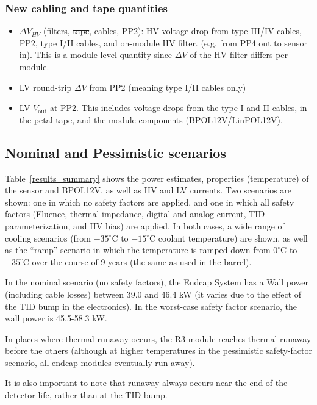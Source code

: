 \subsubsection{New cabling and tape quantities}

\begin{itemize}
\setlength\itemsep{0.0em}
\item $\Delta V_{HV}$ (filters, \sout{tape}, cables, PP2): HV voltage drop from type
III/IV cables, PP2, type I/II cables, and on-module HV filter. (e.g. from PP4 out to sensor in).
This is a module-level quantity since $\Delta V$ of the HV filter differs per module.
\item LV round-trip $\Delta V$ from PP2 (meaning type I/II cables only)
\item LV $V_\text{out}$ at PP2. This includes voltage drops from the type I and II cables, in the
  petal tape, and the module components (BPOL12V/LinPOL12V).
\end{itemize}

\subsection{Nominal and Pessimistic scenarios}

Table~\ref{results_summary} shows the power estimates, properties (temperature) of the sensor and
BPOL12V, as well as HV and LV currents. Two scenarios are shown: one in which no safety factors are
applied, and one in which all safety factors (Fluence, thermal impedance, digital and analog current,
TID parameterization, and HV bias) are applied. In both cases, a wide range of cooling scenarios
(from $-35^\circ$C to $-15^\circ$C coolant temperature) are shown, as well as the ``ramp'' scenario
in which the temperature is ramped down from $0^\circ$C to $-35^\circ$C over the course of 9 years
(the same as used in the barrel).

In the nominal scenario (no safety factors), the Endcap System has a Wall power (including cable losses) between 39.0
and 46.4 kW (it varies due to the effect of the TID bump in the electronics).
In the worst-case safety factor scenario, the wall power is 45.5-58.3 kW.

In places where thermal runaway occurs, the R3 module reaches thermal runaway before the others
(although at higher temperatures in the pessimistic safety-factor scenario, all endcap modules
eventually run away).

It is also important to note that runaway always occurs near the end of the detector life, rather than
at the TID bump.

